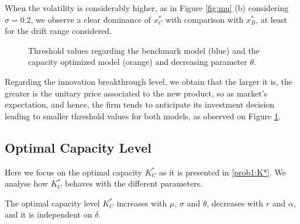 When the volatility is considerably higher, as in Figure \ref{fig:mu} (b) considering $\sigma=0.2$, we observe a clear dominance of $x^*_C$ with comparison with $x^*_B$, at least for the drift range considered.







\begin{figure}[!htb]
	\centering
	\caption{Threshold values regarding the benchmark model (blue) and the capacity optimized model (orange) and decreasing parameter $\theta$.}
	\label{fig:td}
\end{figure}

Regarding the innovation breakthrough level, we obtain that the larger it is, the greater is the unitary price associated to the new product, so as market's expectation, and hence, the firm tends to anticipate its investment decision leading to smaller threshold values for both models, as observed on Figure \ref{fig:td}.



\subsection{Optimal Capacity Level}

Here we focus on the optimal capacity $K^*_C$ as it is presented in \eqref{prob1:K*}. We analyse how $K_C^*$ behaves with the different parameters.

\begin{prop}
	\label{1_prop3}
The optimal capacity level $K^*_C$ increases with $\mu$, $\sigma$ and $\theta$, decreases with $r$ and $\alpha$, and it is independent on $\delta$.
\end{prop}


